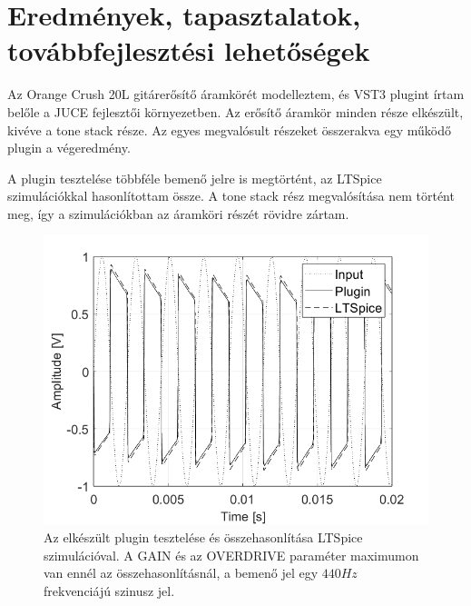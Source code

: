 \chapter{Eredmények, tapasztalatok, továbbfejlesztési lehetőségek}
Az Orange Crush 20L gitárerősítő áramkörét modelleztem, és VST3 plugint írtam belőle a JUCE fejlesztői környezetben. Az erősítő áramkör minden része elkészült, kivéve a tone stack része. Az egyes megvalósult részeket összerakva egy működő plugin a végeredmény.

A plugin tesztelése többféle bemenő jelre is megtörtént, az LTSpice szimulációkkal hasonlítottam össze. A tone stack rész megvalósítása nem történt meg, így a szimulációkban az áramköri részét rövidre zártam. 
\begin{figure}[H]
    \centering
    \includegraphics[scale=0.5]{figures/final.png}
    \caption{Az elkészült plugin tesztelése és összehasonlítása LTSpice szimulációval. A GAIN és az OVERDRIVE paraméter maximumon van ennél az összehasonlításnál, a bemenő jel egy $440Hz$ frekvenciájú szinusz jel.}
\end{figure}
